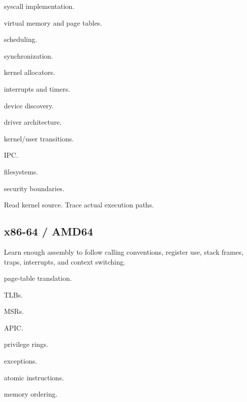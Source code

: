 \documentclass[11pt,letterpaper]{article}
\begin{document}
\begin{topics}

\item syscall implementation.

\item virtual memory and page tables.

\item scheduling.

\item synchronization.

\item kernel allocators.

\item interrupts and timers.

\item device discovery.

\item driver architecture.

\item kernel/user transitions.

\item IPC.

\item filesystems.

\item security boundaries.

\end{topics}

Read kernel source. Trace actual execution paths.

\subsection*{x86-64 / AMD64}

Learn enough assembly to follow calling conventions, register use, stack frames, traps, interrupts, and context switching.

\begin{topics}

\item page-table translation.

\item TLBs.

\item MSRs.

\item APIC.

\item privilege rings.

\item exceptions.

\item atomic instructions.

\item memory ordering.

\end{topics}
\end{document}

